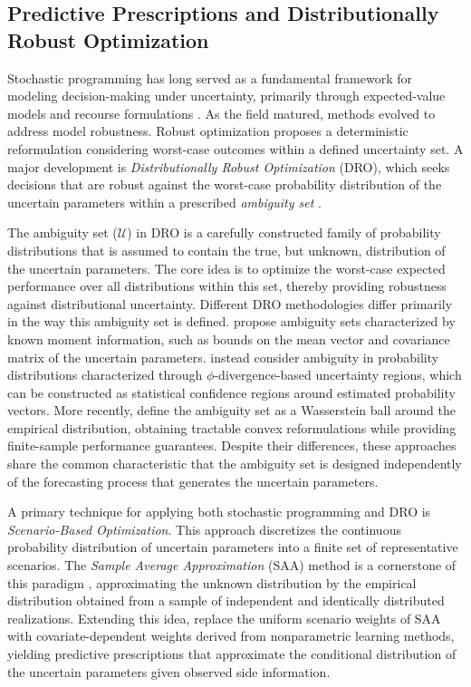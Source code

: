 \documentclass[11pt]{article}
\begin{document}
\subsection{Predictive Prescriptions and Distributionally Robust Optimization}

Stochastic programming has long served as a fundamental framework for modeling decision-making under uncertainty, primarily through expected-value models and recourse formulations \citep{D55,B55}. As the field matured, methods evolved to address model robustness. Robust optimization \citep{BS04} proposes a deterministic reformulation considering worst-case outcomes within a defined uncertainty set. A major development is {\it Distributionally Robust Optimization} (DRO), which seeks decisions that are robust against the worst-case probability distribution of the uncertain parameters within a prescribed {\it ambiguity set} \citep{DY10}.

The ambiguity set ($\mathcal{U}$) in DRO is a carefully constructed family of probability distributions that is assumed to contain the true, but unknown, distribution of the uncertain parameters. The core idea is to optimize the worst-case expected performance over all distributions within this set, thereby providing robustness against distributional uncertainty. Different DRO methodologies differ primarily in the way this ambiguity set is defined. \citet{DY10} propose ambiguity sets characterized by known moment information, such as bounds on the mean vector and covariance matrix of the uncertain parameters. \citet{BTGN13} instead consider ambiguity in probability distributions characterized through $\phi$-divergence-based uncertainty regions, which can be constructed as statistical confidence regions around estimated probability vectors. More recently, \citet{EK98} define the ambiguity set as a Wasserstein ball around the empirical distribution, obtaining tractable convex reformulations while providing finite-sample performance guarantees. Despite their differences, these approaches share the common characteristic that the ambiguity set is designed independently of the forecasting process that generates the uncertain parameters.

A primary technique for applying both stochastic programming and DRO is {\it Scenario-Based Optimization}. This approach discretizes the continuous probability distribution of uncertain parameters into a finite set of representative scenarios. The {\it Sample Average Approximation} (SAA) method is a cornerstone of this paradigm \citep{SH98}, approximating the unknown distribution by the empirical distribution obtained from a sample of independent and identically distributed realizations. Extending this idea, \citet{BK19} replace the uniform scenario weights of SAA with covariate-dependent weights derived from nonparametric learning methods, yielding predictive prescriptions that approximate the conditional distribution of the uncertain parameters given observed side information.
\end{document}

